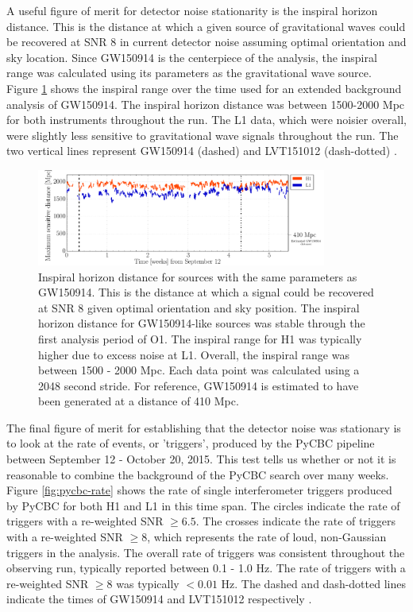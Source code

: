 A useful figure of merit for detector noise stationarity is the
inspiral horizon distance. This is the distance at which a given source
of gravitational waves
could be recovered at SNR 8 in current detector noise assuming
optimal orientation and sky location. Since GW150914 is the
centerpiece of the analysis, the inspiral range was calculated using
its parameters as the gravitational wave source. Figure \ref{fig:inspiral-range}
shows
the inspiral range over the time used for an extended background
analysis of GW150914. The inspiral horizon distance was between 1500-2000 Mpc
for both instruments throughout the run. The L1 data, which were noisier overall,
were slightly less sensitive to
gravitational wave signals throughout the run. The two vertical lines
represent GW150914 (dashed) and LVT151012 (dash-dotted) \cite{GW150914-DETCHAR}.

\begin{figure}[ht!]%
\includegraphics[width=0.85\textwidth]{figures/O1/inspiral-range}
\caption[Inspiral horizon distance in O1]{Inspiral horizon distance for sources with %
         the same parameters as GW150914. This is the distance at %
         which a signal could be recovered at SNR 8 given optimal %
         orientation and sky position. The inspiral horizon distance for %
         GW150914-like sources was stable through the first analysis %
         period of O1. The inspiral %
         range for H1 was typically higher due to excess noise %
         at L1. Overall, the inspiral range was between 1500 - 2000 Mpc. %
         Each data point was calculated using a 2048 second stride. %
         For reference, GW150914 is estimated to have been generated at a %
         distance of 410 Mpc. %
         }
\label{fig:inspiral-range}
\end{figure}

The final figure of merit for establishing that the detector noise was
stationary is to look at the rate of events, or 'triggers', produced by the PyCBC pipeline
between September 12 - October 20, 2015. This test tells us whether or not it
is reasonable to combine the background of the PyCBC search over many weeks.
Figure \ref{fig:pycbc-rate} shows
the rate of single
interferometer triggers produced by PyCBC for both H1 and L1 in this time
span. The circles indicate the rate of triggers with a re-weighted SNR
$\geq 6.5$. The crosses indicate the rate of triggers with a re-weighted SNR
$\geq 8$, which represents the rate of loud, non-Gaussian triggers in the
analysis. The overall rate of triggers was consistent throughout the
observing run, typically reported between 0.1 - 1.0 Hz. The rate of triggers
with a re-weighted SNR $\geq 8$ was typically $< 0.01$ Hz. The dashed
and dash-dotted lines indicate the times of GW150914 and LVT151012 respectively
\cite{GW150914-DETCHAR}.

